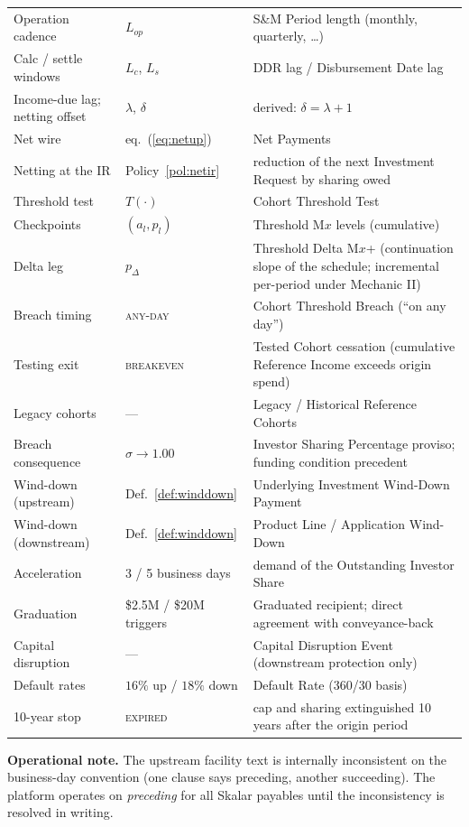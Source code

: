 \documentclass[11pt, a4paper]{article}
\theoremstyle{definition}
\begin{document}
\begin{longtable}{@{} L{4.2cm} L{3.2cm} L{6.8cm} @{}}
Operation cadence & $L_{op}$ & S\&M Period length (monthly, quarterly, \dots) \\[3pt]
Calc / settle windows & $L_c$, $L_s$ & DDR lag / Disbursement Date lag \\[3pt]
Income-due lag; netting offset & $\lambda$, $\delta$ & derived: $\delta = \lambda + 1$ \\[3pt]
Net wire & eq.~(\ref{eq:netup}) & Net Payments \\[3pt]
Netting at the IR & Policy~\ref{pol:netir} & reduction of the next Investment Request by sharing owed \\[3pt]
Threshold test & $T(\cdot)$ & Cohort Threshold Test \\[3pt]
Checkpoints & $(a_l, p_l)$ & Threshold M$x$ levels (cumulative) \\[3pt]
Delta leg & $p_\Delta$ & Threshold Delta M$x$+ (continuation slope of the schedule; incremental per-period under Mechanic II) \\[3pt]
Breach timing & \textsc{any-day} & Cohort Threshold Breach (``on any day'') \\[3pt]
Testing exit & \textsc{breakeven} & Tested Cohort cessation (cumulative Reference Income exceeds origin spend) \\[3pt]
Legacy cohorts & --- & Legacy / Historical Reference Cohorts \\[3pt]
Breach consequence & $\sigma \to 1.00$ & Investor Sharing Percentage proviso; funding condition precedent \\[3pt]
Wind-down (upstream) & Def.~\ref{def:winddown} & Underlying Investment Wind-Down Payment \\[3pt]
Wind-down (downstream) & Def.~\ref{def:winddown} & Product Line / Application Wind-Down \\[3pt]
Acceleration & 3 / 5 business days & demand of the Outstanding Investor Share \\[3pt]
Graduation & \$2.5M / \$20M triggers & Graduated recipient; direct agreement with conveyance-back \\[3pt]
Capital disruption & --- & Capital Disruption Event (downstream protection only) \\[3pt]
Default rates & $16\%$ up / $18\%$ down & Default Rate (360/30 basis) \\[3pt]
10-year stop & \textsc{expired} & cap and sharing extinguished 10 years after the origin period \\
\bottomrule
\end{longtable}

\textbf{Operational note.} The upstream facility text is internally inconsistent on the business-day convention (one clause says preceding, another succeeding). The platform operates on \emph{preceding} for all Skalar payables until the inconsistency is resolved in writing.
\end{document}
